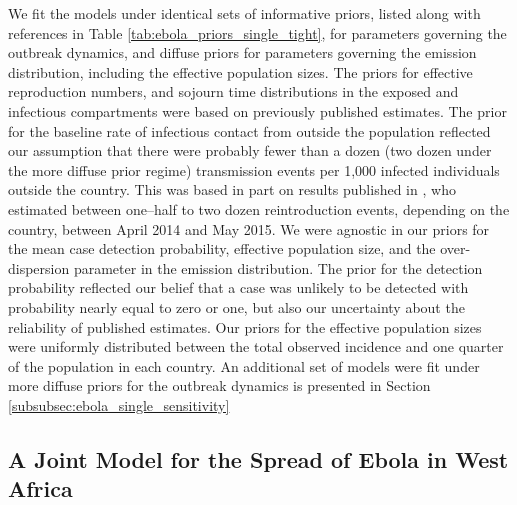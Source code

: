 We fit the models under identical sets of informative priors, listed along with references in Table \ref{tab:ebola_priors_single_tight}, for parameters governing the outbreak dynamics, and diffuse priors for parameters governing the emission distribution, including the effective population sizes. The priors for effective reproduction numbers, and sojourn time distributions in the exposed and infectious compartments were based on previously published estimates. The prior for the baseline rate of infectious contact from outside the population reflected our assumption that there were probably fewer than a dozen (two dozen under the more diffuse prior regime) transmission events per 1,000 infected individuals outside the country. This was based in part on results published in \cite{dudas2017virus}, who estimated between one--half to two dozen reintroduction events, depending on the country, between April 2014 and May 2015. We were agnostic in our priors for the mean case detection probability, effective population size, and the over-dispersion parameter in the emission distribution. The prior for the detection probability reflected our belief that a case was unlikely to be detected with probability nearly equal to zero or one, but also our uncertainty about the reliability of published estimates. Our priors for the effective population sizes were uniformly distributed between the total observed incidence and one quarter of the population in each country. An additional set of models were fit under more diffuse priors for the outbreak dynamics is presented in Section \ref{subsubsec:ebola_single_sensitivity}

\subsection{A Joint Model for the Spread of Ebola in West Africa}
\label{subsec:ebola_joint}

